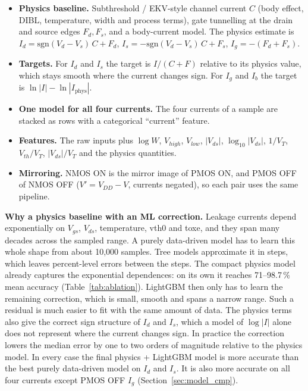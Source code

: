 \documentclass[12pt]{article}
\begin{document}
\begin{itemize}
    \item \textbf{Physics baseline.} Subthreshold / EKV-style channel current $C$ (body effect, DIBL,
          temperature, width and process terms), gate tunnelling at the drain and source edges
          $F_d, F_s$, and a body-current model. The physics estimate is
          $I_d=\mathrm{sgn}(V_d-V_s)\,C+F_d$, $I_s=-\mathrm{sgn}(V_d-V_s)\,C+F_s$, $I_g=-(F_d+F_s)$.
    \item \textbf{Targets.} For $I_d$ and $I_s$ the target is $I/(C+F)$ relative to its physics
          value, which stays smooth where the current changes sign. For $I_g$ and $I_b$ the target
          is $\ln|I| - \ln|I_\text{phys}|$.
    \item \textbf{One model for all four currents.} The four currents of a sample are stacked as
          rows with a categorical ``current'' feature.
    \item \textbf{Features.} The raw inputs plus $\log W$, $V_{high}$, $V_{low}$, $|V_{ds}|$,
          $\log_{10}|V_{ds}|$, $1/V_T$, $V_{th}/V_T$, $|V_{ds}|/V_T$ and the physics quantities.
    \item \textbf{Mirroring.} NMOS ON is the mirror image of PMOS ON, and PMOS OFF of NMOS OFF
          ($V' = V_{DD}-V$, currents negated), so each pair uses the same pipeline.
\end{itemize}

\textbf{Why a physics baseline with an ML correction.} Leakage currents depend exponentially on
$V_{gs}$, $V_{ds}$, temperature, vth0 and toxe, and they span many decades across the sampled
range. A purely data-driven model has to learn this whole shape from about 10{,}000 samples. Tree
models approximate it in steps, which leaves percent-level errors between the steps. The compact
physics model already captures the exponential dependences: on its own it reaches 71--98.7\,\% mean
accuracy (Table~\ref{tab:ablation}). LightGBM then only has to learn the remaining correction,
which is small, smooth and spans a narrow range. Such a residual is much easier to fit with the
same amount of data. The physics terms also give the correct sign structure of $I_d$ and $I_s$,
which a model of $\log|I|$ alone does not represent where the current changes sign. In practice the
correction lowers the median error by one to two orders of magnitude relative to the physics model.
In every case the final physics + LightGBM model is more accurate than the best purely data-driven
model on $I_d$ and $I_s$. It is also more accurate on all four currents except PMOS OFF $I_g$
(Section~\ref{sec:model_cmp}).
\end{document}
